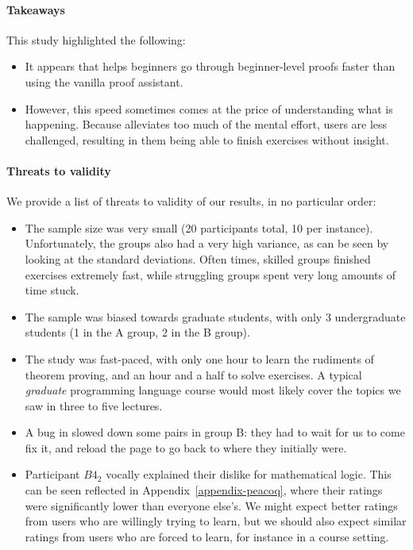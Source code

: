 \paragraph{Takeaways}

This study highlighted the following:

\begin{itemize}

\item It appears that \PeaCoq{} helps beginners go through beginner-level proofs
faster than using the vanilla proof assistant.

\item However, this speed sometimes comes at the price of understanding what is
happening.  Because \PeaCoq{} alleviates too much of the mental effort, users
are less challenged, resulting in them being able to finish exercises without
insight.

\end{itemize}

\paragraph{Threats to validity}

We provide a list of threats to validity of our results, in no particular order:

\begin{itemize}

  \item The sample size was very small (20 participants total, 10 per instance).
Unfortunately, the groups also had a very high variance, as can be seen by
looking at the standard deviations.  Often times, skilled groups finished
exercises extremely fast, while struggling groups spent very long amounts of
time stuck.

  \item The sample was biased towards graduate students, with only 3
undergraduate students (1 in the A group, 2 in the B group).

  \item The study was fast-paced, with only one hour to learn the rudiments of
theorem proving, and an hour and a half to solve exercises.  A typical
\emph{graduate} programming language course would most likely cover the topics
we saw in three to five lectures.

  \item A bug in \PeaCoq{} slowed down some pairs in group B: they had to wait
for us to come fix it, and reload the page to go back to where they initially
were.

  \item Participant $B4_{2}$ vocally explained their dislike for mathematical
logic.  This can be seen reflected in Appendix~\ref{appendix-peacoq}, where
their ratings were significantly lower than everyone else's.  We might expect better ratings from users who are willingly trying to learn, but we should also expect similar ratings from users who are forced to learn, for instance in a course setting.

\end{itemize}
